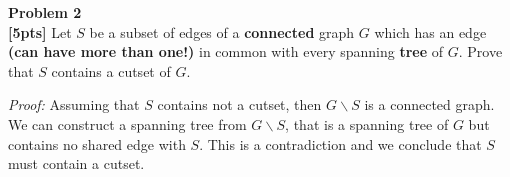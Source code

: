\documentclass{article}
\newenvironment{problem}[2][Problem]
    { \begin{mdframed}[backgroundcolor=gray!20] \textbf{#1 #2} \\}
    {  \end{mdframed}}
\newenvironment{solution}
    {\textit{Proof:}}
    {}
\theoremstyle{definition}
\theoremstyle{definition}
\theoremstyle{remark}
\begin{document}
\newpage

\begin{problem}{2}\textbf{[5pts]}
Let $S$ be a subset of edges of a \textbf{connected} graph $G$ which has an edge \textbf{(can have more than one!)} in common with every spanning \textbf{tree} of $G$.  Prove that $S$ contains a cutset of $G$.
\end{problem}
\begin{solution}
	Assuming that $S$ contains not a cutset, then $G \backslash S$ is a connected graph. We can construct a spanning tree from $G \backslash S$, that is a spanning tree of $G$ but contains no shared edge with $S$. This is a contradiction and we conclude that $S$ must contain a cutset.
\end{solution}
\end{document}
